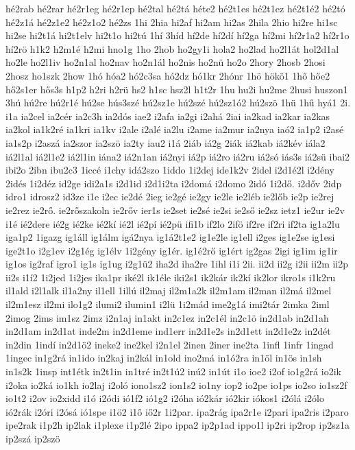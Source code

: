 {hé2rab
hé2rar
hé2r1eg
hé2r1ep
hé2tal
hé2tá
héte2
hé2t1es
hé2t1ez
hé2t1é2
hé2tó
hé2z1á
hé2z1e2
hé2z1o2
hé2zs
1hi
2hia
hi2af
hi2am
hi2as
2hila
2hio
hi2re
hi1sc
hi2se
hi2t1á
hi2t1elv
hi2t1o
hi2tú
1hí
3híd
hí2de
hí2dí
hí2ga
hí2mi
hí2r1a2
hí2r1o
hí2rö
h1k2
h2m1é
h2mi
hno1g
1ho
2hob
ho2gy1i
hola2
ho2lad
ho2l1át
hol2d1al
ho2le
ho2l1iv
ho2n1al
ho2nav
ho2n1ál
ho2nis
ho2nü
ho2o
2hory
2hosb
2hosi
2hosz
ho1szk
2how
1hó
hóa2
hó2c3sa
hó2dz
hó1kr
2hónr
1hö
hökö1
1hő
hőe2
hő2s1er
hős3s
h1p2
h2ri
h2rü
hs2
h1sc
hsz2l
h1t2r
1hu
hu2i
hu2me
2husi
huszon1
3hú
hú2re
hú2r1é
hú2se
hús3szé
hú2sz1e
hú2szé
hú2sz1ó2
hú2szö
1hü
1hű
hyá1
2i.
i1a
ia2cel
ia2cér
ia2c3h
ia2dós
iae2
i2afa
ia2gi
i2ahá
2iai
ia2kad
ia2kar
ia2kas
ia2kol
ia1k2ré
ia1kri
ia1kv
i2ale
i2alé
ia2lu
i2ame
ia2mur
ia2nya
iaó2
ia1p2
i2asé
ia1s2p
i2aszá
ia2szor
ia2szö
ia2ty
iau2
i1á
2iáb
iá2g
2iák
iá2kab
iá2kév
iála2
iá2l1al
iá2l1e2
iá2l1in
iána2
iá2n1an
iá2nyi
iá2p
iá2ro
iá2ru
iá2só
iás3s
iá2sü
ibai2
ibi2o
2ibn
ibu2c3
1iccé
i1chy
idá2szo
1iddo
1i2dej
ide1k2v
2idel
i2d1é2l
i2dény
2idés
1i2déz
id2ge
idi2a1s
i2d1id
i2d1i2ta
i2domá
i2domo
2idó
1i2dő.
i2dőv
2idp
idro1
idrosz2
id3ze
i1e
i2ec
ie2dé
2ieg
ie2gé
ie2gy
ie2le
ie2léb
ie2lőb
ie2p
ie2rej
ie2rez
ie2rő.
ie2rőszakoln
ie2rőv
ier1s
ie2set
ie2sé
ie2si
ie2ső
ie2sz
ietz1
ie2ur
ie2v
i1é
ié2dere
ié2g
ié2ke
ié2kí
ié2l
ié2pí
ié2pü
ifi1b
if2lo
2ifö
if2re
if2ri
if2ta
ig1a2lu
iga1p2
1igazg
ig1áll
ig1álm
igá2nya
ig1á2t1e2
ig1e2le
ig1ell
i2ges
ig1e2se
ig1esi
ige2t1o
i2g1ev
i2g1ég
ig1élv
1i2gény
ig1ér.
ig1é2rő
ig1ért
ig2gas
2igi
ig1im
ig1ir
ig1os
ig2raf
igro1
ig1s
ig1ug
i2g1ü2
iha2d
iha2re
1ihl
i1i
2ii.
ii2d
ii2g
i2ii
ii2m
ii2p
ii2s
i1í2
1i2jed
1i2jes
ika1pr
iké2l
ik1éle
iki2s1
ik2kár
ik2kí
ik2lor
ikro1s
i1k2ru
il1ald
i2l1alk
il1a2ny
il1ell
1illú
il2maj
il2m1a2k
il2m1am
il2man
il2má
il2mel
il2m1esz
il2mi
ilo1g2
ilumi2
ilumin1
i2lü
1i2mád
ime2g1á
imi2tár
2imka
2iml
2imog
2ims
im1sz
2imz
i2n1aj
in1akt
in2c1ez
in2c1él
in2c1ö
in2d1ab
in2d1ah
in2d1am
in2d1at
inde2m
in2d1eme
ind1err
in2d1e2s
in2d1ett
in2d1e2z
in2dét
in2din
1indí
in2d1ö2
ineke2
ine2kel
i2n1el
2inen
2iner
ine2ta
1infl
1infr
1ingad
1ingec
in1g2rá
in1ido
in2kaj
in2kál
in1old
ino2má
in1ó2ra
in1öl
in1ös
in1sh
in1s2k
1insp
int1étk
in2t1in
in1tré
in2t1ú2
inú2
in1út
i1o
ioe2
i2of
io1g2rá
io2ik
i2oka
io2ká
io1kh
io2laj
i2oló
iono1sz2
ion1s2
io1ny
iop2
io2pe
io1ps
io2so
io1sz2f
io1t2
i2ov
io2xidd
i1ó
i2ódi
ió1f2
ió1g2
i2óha
ió2kár
ió2kir
iókos1
i2ólá
i2ólo
ió2rák
i2óri
i2ósá
ió1spe
i1ö2
i1ő
iő2r
1i2par.
ipa2rág
ipa2r1e
i2pari
ipa2ris
i2paro
ipe2rak
i1p2h
ip2lak
i1plexe
i1p2lé
2ipo
ippa2
ip2p1ad
ippo1l
ip2ri
ip2rop
ip2sz1a
ip2szá
ip2szö
}
